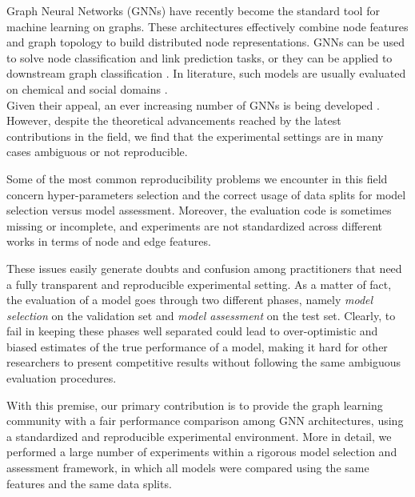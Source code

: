 \documentclass{article}
\begin{document}
Graph Neural Networks (GNNs) \citep{nn4g-micheli,scarselli2009graph} have recently become the standard tool for machine learning on graphs. These architectures effectively combine node features and graph topology to build distributed node representations. GNNs can be used to solve node classification \citep{gcn} and link prediction \citep{link-prediction-gnn} tasks, or they can be applied to downstream graph classification \citep{cgmm}. In literature, such models are usually evaluated on chemical and social domains \citep{how-powerful-gnn}. \\
Given their appeal, an ever increasing number of GNNs is being developed \citep{mpnn-gilmer}. However, despite the theoretical advancements reached by the latest contributions in the field, we find that the experimental settings are in many cases ambiguous or not reproducible.

Some of the most common reproducibility problems we encounter in this field concern hyper-parameters selection and the correct usage of data splits for model selection versus model assessment. Moreover, the evaluation code is sometimes missing or incomplete, and experiments are not standardized across different works in terms of node and edge features. 

These issues easily generate doubts and confusion among practitioners that need a fully transparent and reproducible experimental setting. As a matter of fact, the evaluation of a model goes through two different phases, namely \textit{model selection} on the validation set and \textit{model assessment} on the test set. Clearly, to fail in keeping these phases well separated could lead to over-optimistic and biased estimates of the true performance of a model, making it hard for other researchers to present competitive results without following the same ambiguous evaluation procedures.

With this premise, our primary contribution is to provide the graph learning community with a fair performance comparison among GNN architectures, using a standardized and reproducible experimental environment. More in detail, we performed a large number of experiments within a rigorous model selection and assessment framework, in which all models were compared using the same features and the same data splits. 
\end{document}
